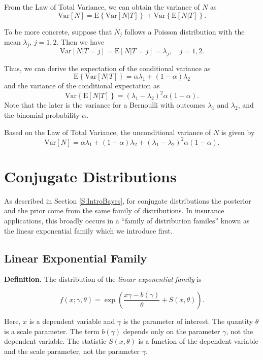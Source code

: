 \documentclass[]{book}
\theoremstyle{definition}
\theoremstyle{definition}
\theoremstyle{definition}
\theoremstyle{remark}
\begin{document}
From the Law of Total Variance, we can obtain the variance of \(N\) as
\[\mathrm{Var}[N]= \mathrm{E} \left\{ \mathrm{Var} \left[ N | T \right] \right \}
    +\mathrm{Var} \left\{ \mathrm{E} \left[ N | T \right] \right \}.\]

To be more concrete, suppose that \(N_j\) follows a Poisson distribution
with the mean \(\lambda_j\), \(j=1,2\). Then we have
\[\mathrm{Var}[N|T=j]= \mathrm{E}[N|T=j] = \lambda_j, \quad j = 1,2.\]

Thus, we can derive the expectation of the conditional variance as
\[\mathrm{E} \left\{ \mathrm{Var} \left[ N | T \right] \right \} = \alpha \lambda_1+ (1-\alpha) \lambda_2\]
and the variance of the conditional expectation as
\[\mathrm{Var} \left\{ \mathrm{E} \left[ N | T \right] \right \} = (\lambda_1-\lambda_2)^2 \alpha (1-\alpha).\]
Note that the later is the variance for a Bernoulli with outcomes
\(\lambda_1\) and \(\lambda_2\), and the binomial probability
\(\alpha\).

Based on the Law of Total Variance, the unconditional variance of \(N\)
is given by
\[\mathrm{Var}[N]= \alpha \lambda_1+ (1-\alpha) \lambda_2 + (\lambda_1-\lambda_2)^2 \alpha (1-\alpha).\]

\section{Conjugate Distributions}\label{S:ConjugateDistributions}

As described in Section \ref{S:IntroBayes}, for conjugate distributions
the posterior and the prior come from the same family of distributions.
In insurance applications, this broadly occurs in a ``family of
distribution familes'' known as the linear exponential family which we
introduce first.

\subsection{Linear Exponential Family}\label{linear-exponential-family}

\textbf{Definition.} The distribution of the \emph{linear exponential
family} is

\begin{equation}
f( x; \gamma ,\theta ) =
\exp \left( \frac{x\gamma -b(\gamma )}{\theta} +S\left( x,\theta \right) \right).
\end{equation}

Here, \(x\) is a dependent variable and \(\gamma\) is the parameter of
interest. The quantity \(\theta\) is a scale parameter. The term
\(b(\gamma)\) depends only on the parameter \(\gamma\), not the
dependent variable. The statistic \(S\left(x,\theta \right)\) is a
function of the dependent variable and the scale parameter, not the
parameter \(\gamma\).
\end{document}
